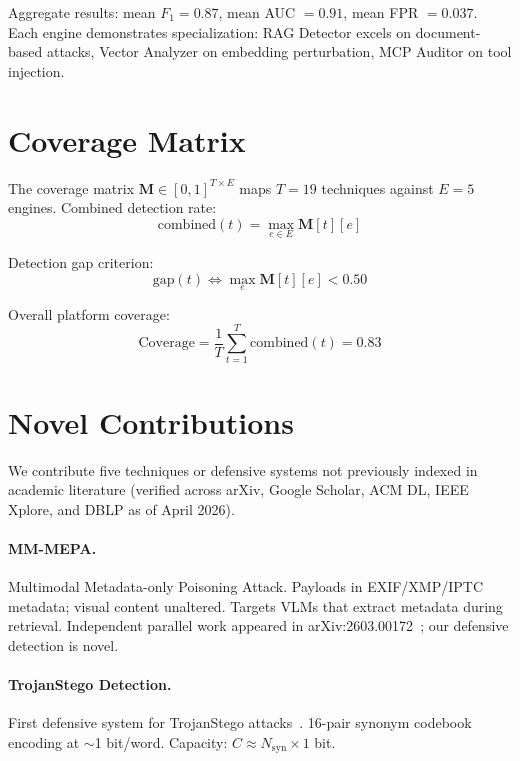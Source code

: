 \documentclass[11pt,twocolumn]{article}
\begin{document}
Aggregate results: mean $F_1 = 0.87$, mean AUC $= 0.91$, mean FPR $= 0.037$. Each engine demonstrates specialization: RAG Detector excels on document-based attacks, Vector Analyzer on embedding perturbation, MCP Auditor on tool injection.

\section{Coverage Matrix}
\label{sec:coverage}

The coverage matrix $\mathbf{M} \in [0,1]^{T \times E}$ maps $T = 19$ techniques against $E = 5$ engines. Combined detection rate:
\begin{equation}
\text{combined}(t) = \max_{e \in E} \mathbf{M}[t][e]
\label{eq:combined}
\end{equation}

Detection gap criterion:
\begin{equation}
\text{gap}(t) \iff \max_{e} \mathbf{M}[t][e] < 0.50
\label{eq:gap}
\end{equation}

Overall platform coverage:
\begin{equation}
\text{Coverage} = \frac{1}{T} \sum_{t=1}^{T} \text{combined}(t) = 0.83
\label{eq:coverage}
\end{equation}

\section{Novel Contributions}
\label{sec:novel}

We contribute five techniques or defensive systems not previously indexed in academic literature (verified across arXiv, Google Scholar, ACM DL, IEEE Xplore, and DBLP as of April 2026).

\paragraph{MM-MEPA.} Multimodal Metadata-only Poisoning Attack. Payloads in EXIF/XMP/IPTC metadata; visual content unaltered. Targets VLMs that extract metadata during retrieval. Independent parallel work appeared in arXiv:2603.00172~\cite{mmepa_parallel}; our defensive detection is novel.

\paragraph{TrojanStego Detection.} First defensive system for TrojanStego attacks~\cite{trojanstego}. 16-pair synonym codebook encoding at $\sim$1 bit/word. Capacity: $C \approx N_{\text{syn}} \times 1$ bit.
\end{document}
